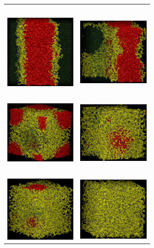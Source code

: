 \documentclass[
journal=mamobx,
manuscript=article,
]{achemso}
\begin{document}
\begin{figure}
	\centering
	\begin{tabular}{C{1.6in}@{}C{1.6in}}
		 \textcolor{white}{$w_{AB}=0.20$} & \textcolor{white}{$w_{AB}=0.30$} \\
		 \includegraphics[width=1.4in]{alt1_020} & \includegraphics[width=1.4in]{alt1_030} \\
		 \textcolor{white}{$w_{AB}=0.60$} & \textcolor{white}{$w_{AB}=0.80$} \\
		 \includegraphics[width=1.4in]{alt1_060} & \includegraphics[width=1.4in]{alt1_080} \\		
		 \textcolor{white}{$w_{AB}=0.85$} & \textcolor{white}{$w_{AB}=1.00$} \\
		 \includegraphics[width=1.4in]{alt1_085} & \includegraphics[width=1.4in]{alt1_100} \\		

\end{tabular}
\end{figure}
\end{document}
